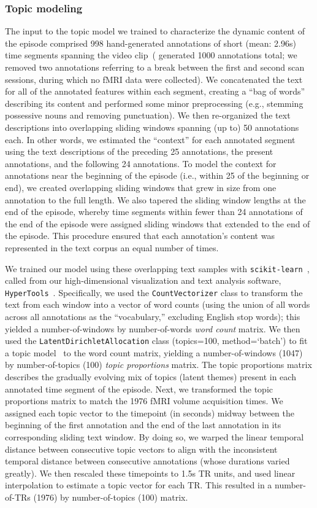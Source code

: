\documentclass[10pt]{article}
\begin{document}
\subsubsection*{Topic modeling}
The input to the topic model we trained to characterize the dynamic content of the episode comprised 998 hand-generated annotations of short (mean: 2.96s) time segments spanning the video clip~(\citealp{ChenEtal17} generated 1000 annotations total; we removed two annotations referring to a break between the first and second scan sessions, during which no fMRI data were collected).  We concatenated the text for all of the annotated features within each segment, creating a ``bag of words'' describing its content and performed some minor preprocessing (e.g., stemming possessive nouns and removing punctuation).  We then re-organized the text descriptions into overlapping sliding windows spanning (up to) 50 annotations each.  In other words, we estimated the ``context'' for each annotated segment using the text descriptions of the preceding 25 annotations, the present annotations, and the following 24 annotations.  To model the context for annotations near the beginning of the episode (i.e., within 25 of the beginning or end), we created overlapping sliding windows that grew in size from one annotation to the full length.  We also tapered the sliding window lengths at the end of the episode, whereby time segments within fewer than 24 annotations of the end of the episode were assigned sliding windows that extended to the end of the episode.  This procedure ensured that each annotation's content was represented in the text corpus an equal number of times.

We trained our model using these overlapping text samples with \texttt{scikit-learn}~\citep[version 0.19.1; ][]{PedrEtal11}, called from our high-dimensional visualization and text analysis software, \texttt{HyperTools}~\citep{HeusEtal18a}.  Specifically, we used the \texttt{CountVectorizer} class to transform the text from each window into a vector of word counts (using the union of all words across all annotations as the ``vocabulary,'' excluding English stop words); this yielded a number-of-windows by number-of-words \textit{word count} matrix.  We then used the \texttt{LatentDirichletAllocation} class (topics=100, method=`batch') to fit a topic model~\citep{BleiEtal03} to the word count matrix, yielding a number-of-windows (1047) by number-of-topics (100) \textit{topic proportions} matrix.  The topic proportions matrix describes the gradually evolving mix of topics (latent themes) present in each annotated time segment of the episode.  Next, we transformed the topic proportions matrix to match the 1976 fMRI volume acquisition times.  We assigned each topic vector to the timepoint (in seconds) midway between the beginning of the first annotation and the end of the last annotation in its corresponding sliding text window.  By doing so, we warped the linear temporal distance between consecutive topic vectors to align with the inconsistent temporal distance between consecutive annotations (whose durations varied greatly).  We then rescaled these timepoints to 1.5s TR units, and used linear interpolation to estimate a topic vector for each TR.  This resulted in a number-of-TRs (1976) by number-of-topics (100) matrix.
\end{document}
